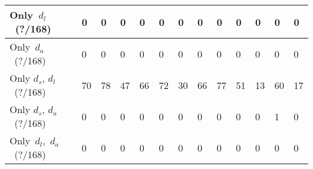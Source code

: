 \begin{sidewaystable}
{\begin{tabular}{l|l|l|l|l|l|l|l|l|l|l|l|l}
\hline
Only~\textbf{$d_l$}~(?/168)                      & 0                                 & 0                                 & 0                                 & 0                                 & 0                                 & 0                                 & 0                                 & 0                                 & 0                                 & 0                                 & 0                                 & 0                                 \\ 
\hline
Only~\textbf{$d_a$}~(?/168)                      & 0                                 & 0                                 & 0                                 & 0                                 & 0                                 & 0                                 & 0                                 & 0                                 & 0                                 & 0                                 & 0                                 & 0                                 \\ 
\hline
Only \textbf{$d_s$}, \textbf{$d_l$}~(?/168)         & 70                                & 78                                & 47                                & 66                                & 72                                & 30                                & 66                                & 77                                & 51                                & 13                                & 60                                & 17                                \\ 
\hline
Only \textbf{$d_s$}, \textbf{$d_a$}~(?/168)         & 0                                 & 0                                 & 0                                 & 0                                 & 0                                 & 0                                 & 0                                 & 0                                 & 0                                 & 0                                 & 1                                 & 0                                 \\ 
\hline
Only~\textbf{$d_l$},~\textbf{$d_a$}~(?/168)         & 0                                 & 0                                 & 0                                 & 0                                 & 0                                 & 0                                 & 0                                 & 0                                 & 0                                 & 0                                 & 0                                 & 0                                 \\ 

\end{tabular}}
\end{sidewaystable}
